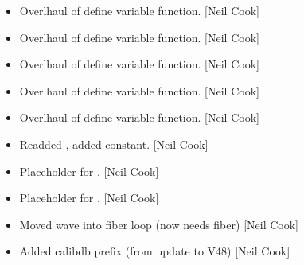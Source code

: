 \documentclass[a4paper,10pt,english]{report}
\begin{document}
\begin{itemize}
\item {} 
Overlhaul of define variable function. {[}Neil Cook{]}

\item {} 
Overlhaul of define variable function. {[}Neil Cook{]}

\item {} 
Overlhaul of define variable function. {[}Neil Cook{]}

\item {} 
Overlhaul of define variable function. {[}Neil Cook{]}

\item {} 
Overlhaul of define variable function. {[}Neil Cook{]}

\item {} 
Readded , added  constant. {[}Neil Cook{]}

\item {} 
Placeholder for . {[}Neil Cook{]}

\item {} 
Placeholder for . {[}Neil Cook{]}

\item {} 
Moved wave into fiber loop (now needs fiber) {[}Neil Cook{]}

\item {} 
Added calibdb prefix (from update to V48) {[}Neil Cook{]}

\end{itemize}
\end{document}

